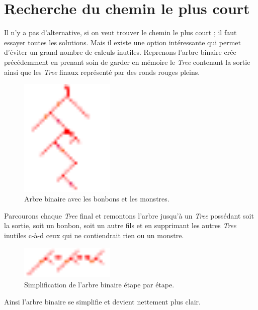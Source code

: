 \section{Recherche du chemin le plus court}

Il n'y a pas d'alternative, si on veut trouver le chemin le plus court ; il faut essayer toutes les solutions. Mais il existe une option intéressante qui permet d'éviter un grand nombre de calculs inutiles. Reprenons l'arbre binaire crée précédemment en prenant soin de garder en mémoire le \textit{Tree} contenant la sortie ainsi que les \textit{Tree} finaux représenté par des ronds rouges pleins.

\begin{figure}[!h]
\centering
\includegraphics[width=0.4\textwidth]{5.recherche/tree.pdf}
\caption{Arbre binaire avec les \textcolor[rgb]{0.91,0.91,0}{bonbons} et les \textcolor[rgb]{0.5,0,1}{monstres}.}
\end{figure}

Parcourons chaque \textit{Tree} final et remontons l'arbre jusqu'à un \textit{Tree} possédant soit la sortie, soit un bonbon, soit un autre fils et en supprimant les autres \textit{Tree} inutiles c-à-d ceux qui ne contiendrait rien ou un monstre.

\begin{figure}[!h]
\centering
\includegraphics[width=0.4\textwidth]{5.recherche/treeStepDelete.pdf}
\caption{Simplification de l'arbre binaire étape par étape.}
\end{figure}

Ainsi l'arbre binaire se simplifie et devient nettement plus clair.

